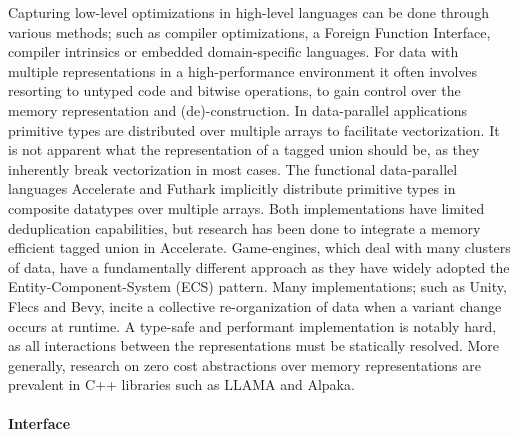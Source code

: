 \documentclass{article}
\begin{document}
Capturing low-level optimizations in high-level languages can be done through various methods; such as compiler optimizations\cite{compiler-optimization}, a Foreign Function Interface\cite{ffi}, compiler intrinsics or embedded domain-specific languages\cite{accelerate-llvm}. 
For data with multiple representations in a high-performance environment it often involves resorting to untyped code and bitwise operations, to gain control over the memory representation and (de)-construction.
In data-parallel applications primitive types are distributed over multiple arrays to facilitate vectorization.
It is not apparent what the representation of a tagged union should be\cite{accelerate-sum-types}, as they inherently break vectorization in most cases. 
The functional data-parallel languages Accelerate\cite{accelerate-sum-types} and Futhark\cite{futhark-sum-types} implicitly distribute primitive types in composite datatypes over multiple arrays.
Both implementations have limited deduplication capabilities, but research has been done to integrate a memory efficient tagged union in Accelerate\cite{accelerate-sum-types}.
Game-engines, which deal with many clusters of data, have a fundamentally different approach as they have widely adopted the Entity-Component-System (ECS) pattern\cite{ecs-origin}. 
Many implementations; such as Unity\cite{unity-ecs-patent}, Flecs\cite{ecs-flecs} and Bevy\cite{ecs-bevy}, incite a collective re-organization of data when a variant change occurs at runtime.
A type-safe and performant implementation is notably hard, as all interactions between the representations must be statically resolved.
More generally, research on zero cost abstractions over memory representations are prevalent in C++ libraries such as LLAMA\cite{llama} and Alpaka\cite{alpaka}. 

\paragraph{Interface}
\end{document}
